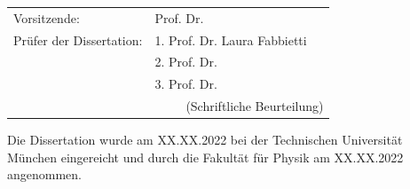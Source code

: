{  	\begin{tabularx}{1.0\textwidth}{XX}
	Vorsitzende:	&	Prof. Dr.  \\
	Prüfer der Dissertation:	&	1. Prof. Dr. Laura Fabbietti \\
							&	2. Prof. Dr.  \\
							&	3. Prof. Dr.  \\
							& \ \ \ \ \  (Schriftliche Beurteilung) \\
	\end{tabularx}


	\vspace*{\fill}

	Die Dissertation wurde am XX.XX.2022 bei der Technischen Universität München
	eingereicht und durch die Fakultät für Physik am XX.XX.2022 angenommen.

  \vspace*{\fill}

  \null
  \vfill

}

